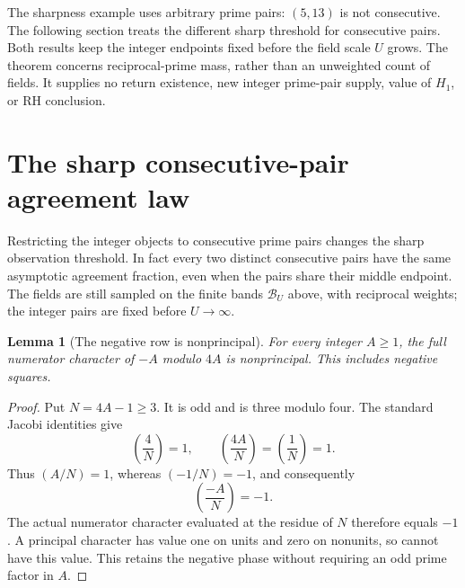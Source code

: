 \documentclass[11pt]{article}
\newtheorem{lemma}[theorem]{Lemma}
\begin{document}
The sharpness example uses arbitrary prime pairs: \((5,13)\) is
not consecutive. The following section treats the different sharp
threshold for consecutive pairs. Both results keep the integer
endpoints fixed before the field scale \(U\) grows.
The theorem concerns reciprocal-prime mass, rather than an
unweighted count of fields. It supplies no return existence,
new integer prime-pair supply, value of \(H_1\), or RH conclusion.

\section{The sharp consecutive-pair agreement law}
\label{sec:native-consecutive-agreement}

Restricting the integer objects to consecutive prime pairs changes the
sharp observation threshold. In fact every two distinct consecutive
pairs have the same asymptotic agreement fraction, even when the pairs
share their middle endpoint. The fields are still sampled on the finite
bands \(\mathcal B_U\) above, with reciprocal weights; the integer pairs
are fixed before \(U\to\infty\).

\begin{lemma}[The negative row is nonprincipal]
\label{lem:native-negative-row}
For every integer \(A\ge1\), the full numerator character of \(-A\)
modulo \(4A\) is nonprincipal. This includes negative squares.
\end{lemma}
\begin{proof}
Put \(N=4A-1\ge3\). It is odd and is three modulo four.
The standard Jacobi identities give
\[
 \left(\frac4N\right)=1,\qquad
 \left(\frac{4A}N\right)=\left(\frac1N\right)=1.
\]
Thus \((A/N)=1\), whereas \((-1/N)=-1\), and consequently
\[
                         \left(\frac{-A}N\right)=-1.
\]
The actual numerator character evaluated at the residue of \(N\)
therefore equals \(-1\). A principal character has value one on
units and zero on nonunits, so cannot have this value. This retains
the negative phase without requiring an odd prime factor in \(A\).
\end{proof}
\end{document}
